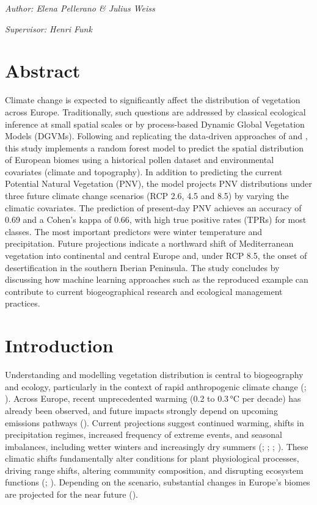 \documentclass[
]{krantz}
\begin{document}
\emph{Author: Elena Pellerano \& Julius Weiss }

\emph{Supervisor: Henri Funk}

\section{Abstract}\label{abstract-4}

Climate change is expected to significantly affect the distribution of vegetation across Europe. Traditionally, such questions are addressed by classical ecological inference at small spatial scales or by process-based Dynamic Global Vegetation Models (DGVMs). Following and replicating the data-driven approaches of \citet{hengl2018} and \citet{bonannella2023}, this study implements a random forest model to predict the spatial distribution of European biomes using a historical pollen dataset and environmental covariates (climate and topography). In addition to predicting the current Potential Natural Vegetation (PNV), the model projects PNV distributions under three future climate change scenarios (RCP 2.6, 4.5 and 8.5) by varying the climatic covariates. The prediction of present-day PNV achieves an accuracy of 0.69 and a Cohen's kappa of 0.66, with high true positive rates (TPRs) for most classes. The most important predictors were winter temperature and precipitation. Future projections indicate a northward shift of Mediterranean vegetation into continental and central Europe and, under RCP 8.5, the onset of desertification in the southern Iberian Peninsula. The study concludes by discussing how machine learning approaches such as the reproduced example can contribute to current biogeographical research and ecological management practices.

\section{Introduction}\label{introduction-1}

Understanding and modelling vegetation distribution is central to biogeography and ecology, particularly in the context of rapid anthropogenic climate change (\citet{fisher2018}; \citet{smith2023}). Across Europe, recent unprecedented warming (0.2 to 0.3\,°C per decade) has already been observed, and future impacts strongly depend on upcoming emissions pathways (\citet{ipcc2021}). Current projections suggest continued warming, shifts in precipitation regimes, increased frequency of extreme events, and seasonal imbalances, including wetter winters and increasingly dry summers (\citet{coppola2021}; \citet{leduc2019}; \citet{palmer2021}; \citet{samaniego2018}). These climatic shifts fundamentally alter conditions for plant physiological processes, driving range shifts, altering community composition, and disrupting ecosystem functions (\citet{forzieri2021}; \citet{kramer2020}). Depending on the scenario, substantial changes in Europe's biomes are projected for the near future (\citet{hickler2012}).
\end{document}
